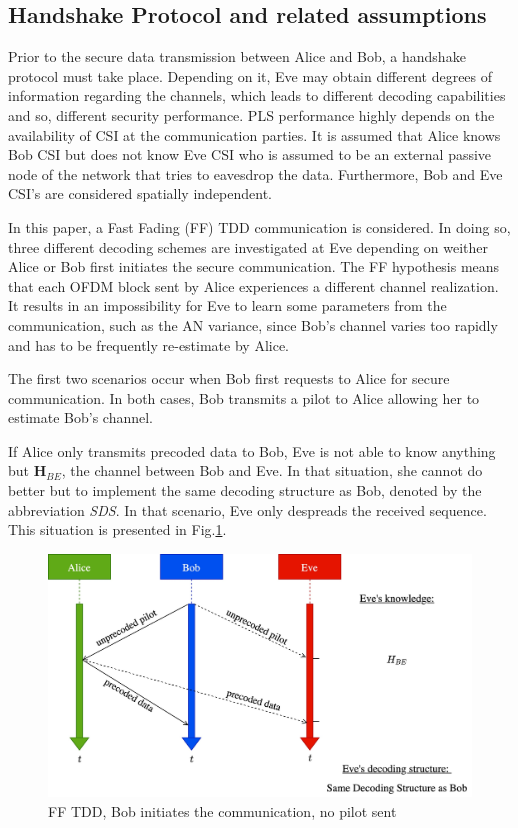 \documentclass[journal,comsoc]{IEEEtran}
\let\MYoriglatexcaption\caption
\renewcommand{\caption}[2][\relax]{\MYoriglatexcaption[#2]{#2}}
\begin{document}
\subsection{Handshake Protocol and related assumptions}\label{sec:establishment}
Prior to the secure data transmission between Alice and Bob, a handshake protocol must take place. Depending on it, Eve may obtain different degrees of information regarding the channels, which leads to different decoding capabilities and so, different security performance. PLS performance highly depends on the availability of CSI at the communication parties. It is assumed that Alice knows Bob CSI but does not know Eve CSI  who is assumed to be an external passive node of the network that tries to eavesdrop the data. Furthermore, Bob and Eve CSI's are considered spatially independent.

In this paper, a Fast Fading (FF) TDD communication is considered. In doing so, three different decoding schemes are investigated at Eve depending on weither Alice or Bob first initiates the secure communication. The FF hypothesis means that each OFDM block sent by Alice experiences a different channel realization. It results in an impossibility for Eve to learn some parameters from the communication, such as the AN variance, since Bob's channel varies too rapidly and has to be frequently re-estimate by Alice. 

The first two scenarios occur when Bob first requests to Alice for secure communication. In both cases, Bob transmits a pilot to Alice allowing her to estimate Bob's channel.

If Alice only transmits precoded data to Bob, Eve is not able to know anything but $\textbf{H}_{BE}$, the channel between Bob and Eve. In that situation, she cannot do better but to implement the same decoding structure as Bob, denoted by the abbreviation \textit{SDS}. In that scenario, Eve only despreads the received sequence. This situation is presented in Fig.\ref{fig_ff_tdd_b_no_pilot}.
\begin{figure}[!htb]
	\centering
	\includegraphics[width=.9\linewidth]{graphs/diagram_sequence-FF_TDD_B_no_pilot.jpg}
	\caption{FF TDD, Bob initiates the communication, no pilot sent}
	\label{fig_ff_tdd_b_no_pilot}
\end{figure} 
\end{document}
